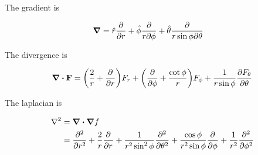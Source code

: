 \documentclass[11pt]{article}
\begin{document}
The gradient is

\begin{align}
  \grad &= \hat r \frac{\partial}{\partial r} + \hat\phi \frac{\partial}{r\partial\phi} + \hat\theta \frac{\partial}{r\sin\phi\partial\theta}
\end{align}

The divergence is

\begin{align}
  \div{\vb{F}} = \qty( \frac{2}{r} + \pdv{}{r} ) F_r + \qty( \pdv{}{\phi} + \frac{\cot\phi}{r} ) F_\phi + \frac{1}{r\sin\phi} \pdv{ F_\theta}{\theta}
\end{align}

The laplacian is


\begin{align}
  \laplacian &= \div{\grad{f}} \\
             &= \pdv[2]{}{r}+\frac{2}{r}\pdv[]{}{r} + \frac{1}{r^2\sin^2\phi}\pdv[2]{}{\theta} + \frac{\cos\phi}{r^2\sin\phi}\pdv[]{}{\phi} + \frac{1}{r^2}\pdv[2]{}{\phi}
\end{align}



\end{document}
